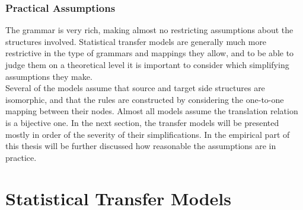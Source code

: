 \documentclass{report}
\theoremstyle{definition}
\theoremstyle{plain}
\begin{document}
\subsubsection{Practical Assumptions}

The \cite{rosetta1994compositional} grammar is very rich, making almost no restricting assumptions about the structures involved. Statistical transfer models are generally much more restrictive in the type of grammars and mappings they allow, and to be able to judge them on a theoretical level it is important to consider which simplifying assumptions they make.\\
Several of the models assume that source and target side structures are isomorphic, and that the rules are constructed by considering the one-to-one mapping between their nodes. Almost all models assume the translation relation is a bijective one. In the next section, the transfer models will be presented mostly in order of the severity of their simplifications. In the empirical part of this thesis will be further discussed how reasonable the assumptions are in practice.


\section{Statistical Transfer Models}
\label{sec:main}
\end{document}
